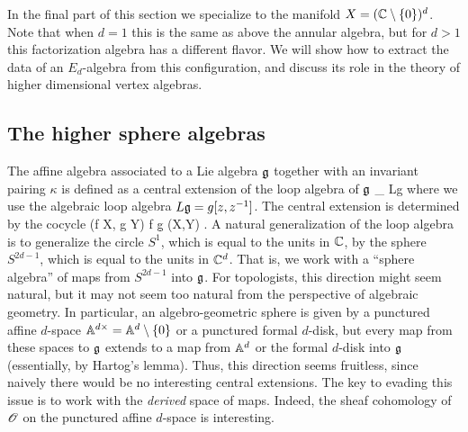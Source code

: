 \documentclass[10pt]{amsart}
\begin{document}

In the final part of this section we specialize to the manifold $X = (\CC \setminus \{0\})^d$. 
Note that when $d=1$ this is the same as above the annular algebra, but for $d>1$ this factorization algebra has a different flavor. 
We will show how to extract the data of an $E_d$-algebra from this configuration, and discuss its role in the theory of higher dimensional vertex algebras. 



\subsection{The higher sphere algebras}

The affine algebra associated to a Lie algebra $\fg$ together with an invariant pairing $\kappa$ is defined as a central extension of the loop algebra of $\fg$
\ben
\CC \to \Hat{\fg}_{\kappa} \to Lg 
\een
where we use the algebraic loop algebra $L\fg = g [z,z^{-1}]$.
The central extension is determined by the cocycle 
\ben
(f \tensor X, g \tensor Y) \mapsto \oint f \d g \kappa(X,Y) .
\een 
A natural generalization of the loop algebra is to generalize the circle $S^1$, which is equal to the units in $\CC$, by the sphere $S^{2d-1}$, which is equal to the units in $\CC^d$.
That is, we work with a ``sphere algebra'' of maps from $S^{2d-1}$ into $\fg$.
For topologists, this direction might seem natural,
but it may not seem too natural from the perspective of algebraic geometry.
In particular, an algebro-geometric sphere is given by a punctured affine $d$-space $\AA^{d\times} = \AA^d \setminus \{0\}$ or a punctured formal $d$-disk,
but every map from these spaces to $\fg$ extends to a map from $\AA^d$ or the formal $d$-disk into $\fg$ (essentially, by Hartog's lemma).
Thus, this direction seems fruitless, since naively there would be no interesting central extensions.
The key to evading this issue is to work with the {\em derived} space of maps. 
Indeed, the sheaf cohomology of $\sO$ on the punctured affine $d$-space is interesting. 
\end{document}
